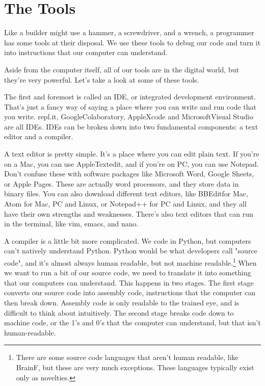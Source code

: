 \section{The Tools}
Like a builder might use a hammer, a screwdriver, and a wrench, a programmer has some tools at their disposal. We use these tools to debug our code and turn it into instructions that our computer can understand.\par
Aside from the computer itself, all of our tools are in the digital world, but they're very powerful. Let's take a look at some of these tools.\par
The first and foremost is called an IDE, or integrated development environment. That's just a fancy way of saying a place where you can write and run code that you write. repl.it, Google\textregistered Colaboratory, Apple\textregistered Xcode and Microsoft\textregistered Visual Studio are all IDEs. IDEs can be broken down into two fundamental components: a text editor and a compiler.\par
A text editor is pretty simple. It's a place where you can edit plain text. If you're on a Mac, you can use Apple\textregistered Textedit, and if you're on PC, you can use Notepad. Don’t confuse these with software packages like Microsoft Word, Google Sheets, or Apple Pages. These are actually word processors, and they store data in binary files. You can also download different text editors, like BBEdit\textregistered for Mac, Atom for Mac, PC and Linux, or Notepad++ for PC and Linux, and they all have their own strengths and weaknesses. There's also text editors that can run in the terminal, like vim, emacs, and nano.\par
A compiler is a little bit more complicated. We code in Python, but computers can't natively understand Python. Python would be what developers call "source code", and it's almost always human readable, but not machine readable.\footnote{There are some source code languages that aren't human readable, like BrainF, but these are very much exceptions. These languages typically exist only as novelties.} When we want to run a bit of our source code, we need to translate it into something that our computers can understand. This happens in two stages. The first stage converts our source code into assembly code, instructions that the computer can then break down. Assembly code is only readable to the trained eye, and is difficult to think about intuitively. The second stage breaks code down to machine code, or the 1's and 0's that the computer can understand, but that isn't human-readable.\par

